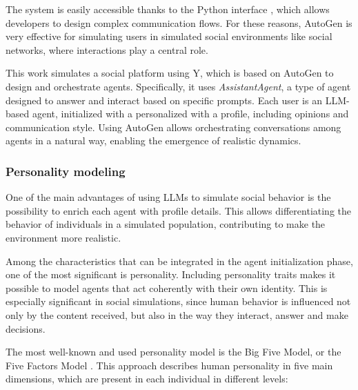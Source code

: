\medskip
The system is easily accessible thanks to the Python interface \cite{pyautogen0.2.31}, which allows developers to design complex communication flows.
For these reasons, AutoGen is very effective for simulating users in simulated social environments like social networks, where interactions play a central role.

\medskip
This work simulates a social platform using Y\cite{rossetti2024ysocialllmpoweredsocial}, which is based on AutoGen to design and orchestrate agents.
Specifically, it uses \textit{AssistantAgent}, a type of agent designed to answer and interact based on specific prompts.
Each user is an LLM-based agent, initialized with a personalized with a profile, including opinions and communication style.
Using AutoGen allows orchestrating conversations among agents in a natural way, enabling the emergence of realistic dynamics.


\subsubsection{Personality modeling}
One of the main advantages of using LLMs to simulate social behavior is the possibility to enrich each agent with profile details.
This allows differentiating the behavior of individuals in a simulated population, contributing to make the environment more realistic.

Among the characteristics that can be integrated in the agent initialization phase, one of the most significant is personality.
Including personality traits makes it possible to model agents that act coherently with their own identity.
This is especially significant in social simulations, since human behavior is influenced not only by the content received, but also in the way they interact, answer and make decisions.

\medskip
The most well-known and used personality model is the Big Five Model, or the Five Factors Model \cite{barrick1991bigfive, McCrae1992}. This approach describes human personality in five main dimensions, which are present in each individual in different levels:

